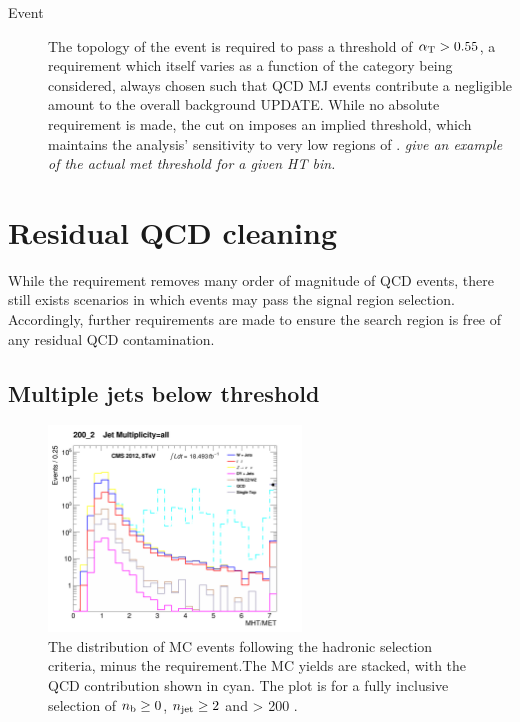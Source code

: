 \begin{description}
\item[Event]
The topology of the event is required to pass a threshold of $\alpha_{\text{T}} > 0.55$, 
a requirement which itself varies as a function of the \HT category being
considered, always
chosen such that QCD MJ events contribute a negligible amount to the overall 
background UPDATE. While no absolute \met requirement is made, the cut on 
\alphat imposes an implied threshold, which maintains the analysis'
sensitivity to very low regions of \met. \emph{give an example of the actual met
threshold for a given HT bin.}

\end{description}

\section{Residual QCD cleaning}

While the \alphat requirement removes many order of magnitude of QCD events,
there still exists scenarios in which events may pass the signal region
selection. Accordingly, further requirements are made to ensure the search
region is free of any residual QCD contamination.

\subsection{Multiple jets below threshold}
\label{sec:qcd_cleaning_below_thresh}

\begin{figure}[ht!]
\centering
\includegraphics[width=0.6\textwidth]
{Figs/datamc/had/v1/Stacked_MHTovMET_all_200_upwards.png}
\caption{The \mhtmet distribution of MC events following the hadronic selection
criteria, minus the \mhtmet requirement.The MC yields are stacked,
with the QCD contribution shown in cyan. The plot is for a fully inclusive
selection of $n_{\text{b}} \geq 0$, $n_{\text{jet}} \geq 2$ and \HT > 200 \gev.}
\label{fig:full_mhtmet_distro}
\end{figure}

